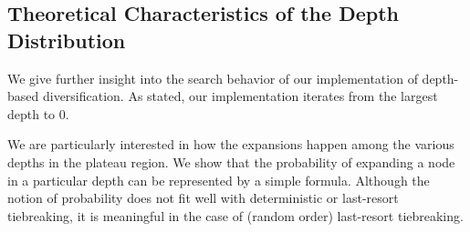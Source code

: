 


\subsection{Theoretical Characteristics of the Depth Distribution}

We give further insight into the search behavior of our implementation
of depth-based diversification.
As stated, our implementation iterates from the largest depth to 0.

We are particularly interested in how the expansions happen among the
various depths in the plateau region.
We show that the probability of expanding a node in a particular depth
can be represented by a simple formula.  Although the notion of
probability does not fit well with deterministic \fifo or \lifo
last-resort tiebreaking, it is meaningful in the case of \ro (random
order) last-resort tiebreaking.


